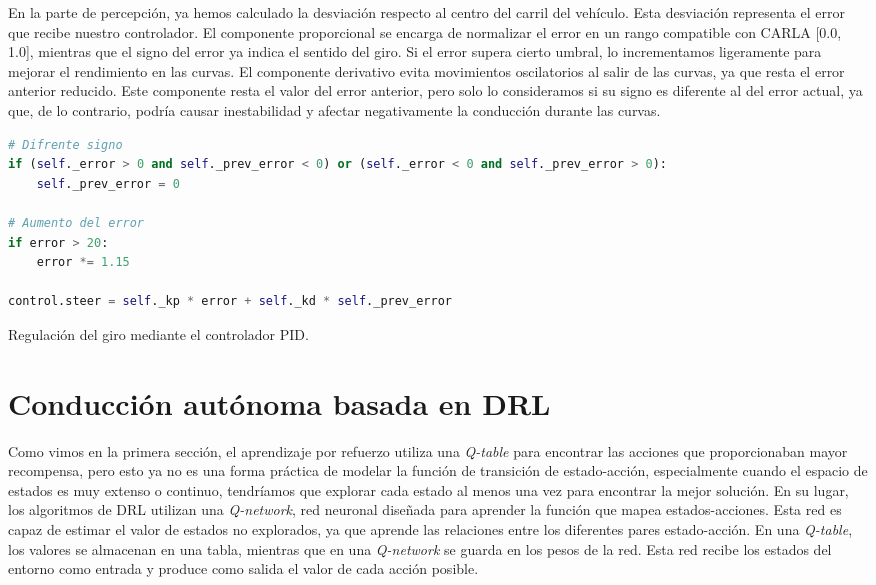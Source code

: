 En la parte de percepción, ya hemos calculado la desviación respecto al centro del carril del vehículo. Esta desviación representa el error que recibe nuestro controlador. El componente proporcional se encarga de normalizar el error en un rango compatible con CARLA [0.0, 1.0], mientras que el signo del error ya indica el sentido del giro. Si el error supera cierto umbral, lo incrementamos ligeramente para mejorar el rendimiento en las curvas. El componente derivativo evita movimientos oscilatorios al salir de las curvas, ya que resta el error anterior reducido. Este componente resta el valor del error anterior, pero solo lo consideramos si su signo es diferente al del error actual, ya que, de lo contrario, podría causar inestabilidad y afectar negativamente la conducción durante las curvas.
\begin{code}[h]
\begin{lstlisting}[language=Python]
# Difrente signo
if (self._error > 0 and self._prev_error < 0) or (self._error < 0 and self._prev_error > 0):
	self._prev_error = 0       

# Aumento del error
if error > 20:
	error *= 1.15

control.steer = self._kp * error + self._kd * self._prev_error
\end{lstlisting}
\caption[Regulación del giro mediante el controlador \ac{PID}]{Regulación del giro mediante el controlador \ac{PID}.}
\label{cod:pid_giro}
\end{code}

\section{Conducción autónoma basada en \ac{DRL}}

Como vimos en la primera sección, el aprendizaje por refuerzo utiliza una \textit{Q-table} para encontrar las acciones que proporcionaban mayor recompensa, pero esto ya no es una forma práctica de modelar la función de transición de estado-acción, especialmente cuando el espacio de estados es muy extenso o continuo, tendríamos que explorar cada estado al menos una vez para encontrar la mejor solución. En su lugar, los algoritmos de \ac{DRL} utilizan una \textit{Q-network}, red neuronal diseñada para aprender la función que mapea estados-acciones. Esta red es capaz de estimar el valor de estados no explorados, ya que aprende las relaciones entre los diferentes pares estado-acción. En una \textit{Q-table}, los valores se almacenan en una tabla, mientras que en una \textit{Q-network} se guarda en los pesos de la red. Esta red recibe los estados del entorno como entrada y produce como salida el valor de cada acción posible. 

